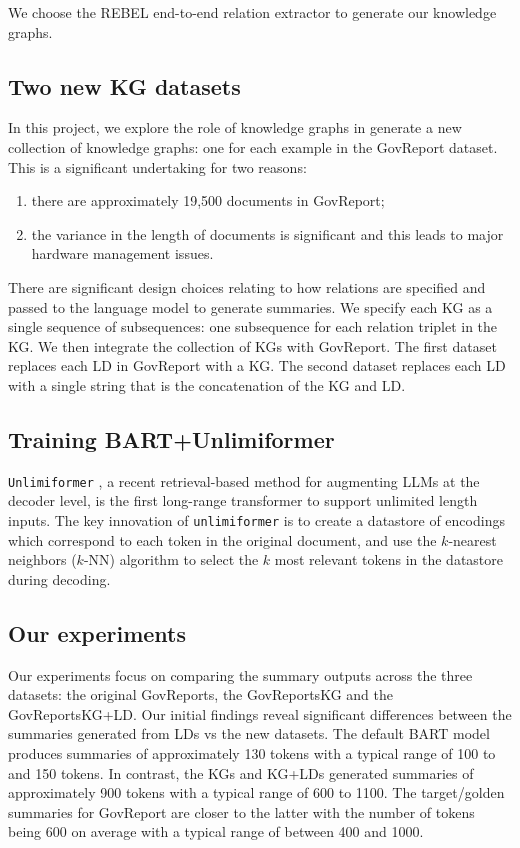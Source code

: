 \documentclass[12pt]{article}
\begin{document}
We choose the REBEL end-to-end relation extractor to generate our knowledge graphs.

\subsection*{Two new KG datasets} In this project, we explore the role of
knowledge graphs in generate a new collection of knowledge graphs: one for each
example in the GovReport dataset. This is a significant undertaking for two
reasons:
\begin{enumerate}
  \item there are approximately 19,500 documents in GovReport;
  \item the variance in the length of documents is significant and this leads
    to major hardware management issues.
\end{enumerate}
There are significant design choices relating to how relations are specified
and passed to the language model to generate summaries. We specify
each KG as a single sequence of subsequences: one subsequence for each relation
triplet in the KG. We then integrate the collection of KGs with GovReport.
The first dataset replaces each LD in GovReport with a KG. The second dataset replaces each LD with a single string that is the concatenation of the KG and LD.
\subsection*{Training BART+Unlimiformer} \texttt{Unlimiformer}
\cite{bertsch2023unlimiformer}, a recent retrieval-based method for augmenting
LLMs at the decoder level, is the first long-range transformer to support
unlimited length inputs. The key innovation of \texttt{unlimiformer} is to
create a datastore of encodings which correspond to each token in the original
document, and use the $k$-nearest neighbors ($k$-NN) algorithm to select the
$k$ most relevant tokens in the datastore during decoding.

\subsection*{Our experiments} Our experiments focus on comparing the summary
outputs across the three datasets: the original GovReports, the GovReportsKG
and the GovReportsKG+LD. Our initial findings reveal significant differences
between the summaries generated from LDs vs the new datasets. The default BART
model produces summaries of approximately 130 tokens with a typical range of
100 to  and 150 tokens. In contrast, the KGs and KG+LDs generated summaries of
approximately 900 tokens with a typical range of 600 to 1100. The target/golden
summaries for GovReport are closer to the latter with the number of tokens
being 600 on average with a typical range of between 400 and 1000.
\end{document}
